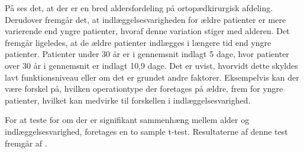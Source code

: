 \noindent
På  ses det, at der er en bred aldersfordeling på ortopædkirurgisk afdeling. Derudover fremgår det, at indlæggelsesvarigheden for ældre patienter er mere varierende end yngre patienter, hvoraf denne variation stiger med alderen. Det fremgår ligeledes, at de ældre patienter indlægges i længere tid end yngre patienter. Patienter under $30$ år er i gennemsnit indlagt 5 dage, hvor patienter over $30$ år i gennemsnit er indlagt 10,9 dage. Det er uvist, hvorvidt dette skyldes lavt funktionsniveau eller om det er grundet andre faktorer. Eksempelvis kan der være forskel på, hvilken operationtype der foretages på ældre, frem for yngre patienter, hvilket kan medvirke til forskellen i indlæggelsesvarighed.

For at teste for om der er signifikant sammenhæng mellem alder og indlæggelsesvarighed, foretages en to sample t-test. Resultaterne af denne test fremgår af .

